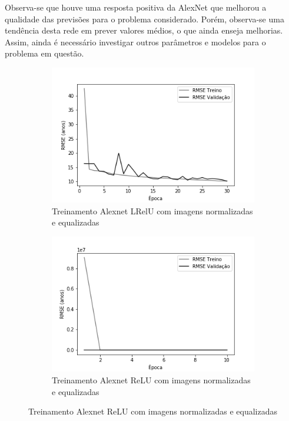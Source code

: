 Observa-se que houve uma resposta positiva da AlexNet que melhorou a qualidade das previsões para o problema considerado. Porém, observa-se uma tendência desta rede em prever valores médios, o que ainda enseja melhorias. Assim, ainda é necessário investigar outros parâmetros e modelos para o problema em questão.


\begin{figure}[hb!]
	\caption{Redes neurais biológicas.}
	\begin{subfigure}[hb]{0.5\linewidth}
		\caption{Treinamento Alexnet LRelU com imagens normalizadas e equalizadas}
		\label{fig:histalexlrelunorm}
		\includegraphics[width=\linewidth]{img/graficos-fase2/fig-history-alexnet-lrelu-data-augmentation-22.png}
	\end{subfigure}%
	\begin{subfigure}[hb]{0.5\linewidth}
		\caption{Treinamento Alexnet ReLU com imagens normalizadas e equalizadas}
		\label{fig:redeneuralbiologica}
		\includegraphics[width=\linewidth]{img/graficos-fase2/fig-history-alexnet-relu-data-augmentation-21.png}

\end{subfigure}
\end{figure}
